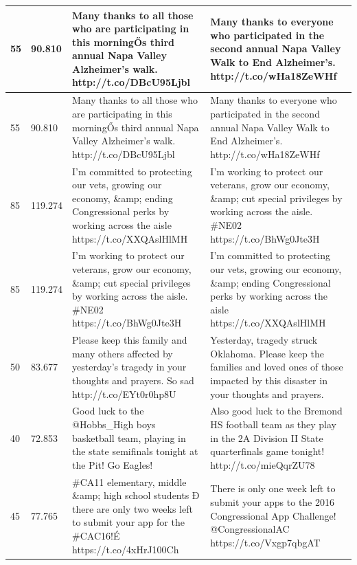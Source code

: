 \begin{table}[]
\begin{tabular}{|p{}|p{}|p{}|p{}|}
55       & 90.810                      & Many thanks to all those who are participating in this morningŐs third annual Napa Valley Alzheimer's walk. http://t.co/DBcU95Ljbl                      & Many thanks to everyone who participated in the second annual Napa Valley Walk to End Alzheimer's. http://t.co/wHa18ZeWHf                           \\ \hline
55       & 90.810                      & Many thanks to all those who are participating in this morningŐs third annual Napa Valley Alzheimer's walk. http://t.co/DBcU95Ljbl                      & Many thanks to everyone who participated in the second annual Napa Valley Walk to End Alzheimer's. http://t.co/wHa18ZeWHf                           \\ \hline
85       & 119.274                     & I'm committed to protecting our vets, growing our economy, \&amp; ending Congressional perks by working across the aisle https://t.co/XXQAslHlMH        & I'm working to protect our veterans, grow our economy, \&amp; cut special privileges by working across the aisle. \#NE02 https://t.co/BhWg0Jte3H    \\ \hline
85       & 119.274                     & I'm working to protect our veterans, grow our economy, \&amp; cut special privileges by working across the aisle. \#NE02 https://t.co/BhWg0Jte3H        & I'm committed to protecting our vets, growing our economy, \&amp; ending Congressional perks by working across the aisle https://t.co/XXQAslHlMH    \\ \hline
50       & 83.677                      & Please keep this family and many others affected by yesterday's tragedy in your thoughts and prayers. So sad  http://t.co/EYt0r0hp8U                    & Yesterday, tragedy struck Oklahoma. Please keep the families and loved ones of those impacted by this disaster in your thoughts and prayers.        \\ \hline
40       & 72.853                      & Good luck to the @Hobbs\_High boys basketball team, playing in the state semifinals tonight at the Pit!  Go Eagles!                                     & Also good luck to the Bremond HS football team as they play in the 2A Division II State quarterfinals game tonight! http://t.co/mieQqrZU78          \\ \hline
45       & 77.765                      & \#CA11 elementary, middle \&amp; high school students Đ there are only two weeks left to submit your app for the \#CAC16!É https://t.co/4xHrJ100Ch      & There is only one week left to submit your apps to the 2016 Congressional App Challenge! @CongressionalAC https://t.co/Vxgp7qbgAT                   \\ \hline

\end{tabular}
\end{table}
